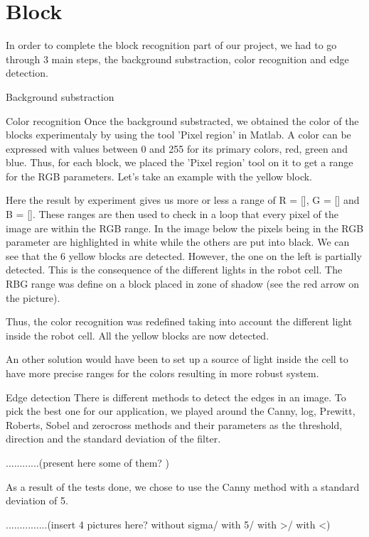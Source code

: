 
\chapter{Block}\label{ch:block_recognition}


In order to complete the block recognition part of our project, we had to go through 3 main steps, the background substraction, color recognition and edge detection.

Background substraction

Color recognition
 	Once the background substracted, we obtained the color of the blocks experimentaly by using the tool 'Pixel region' in Matlab. A color can be expressed with values between 0 and 255 for its primary colors, red, green and blue. Thus, for each block, we placed the 'Pixel region' tool on it to get a range for the RGB parameters.
Let's take an example with the yellow block.
 	\graphicspath{{figures/Thres_Y_manualy.png}}
Here the result by experiment gives us more or less a range of R = [], G = [] and B = []. These ranges are then used to check in a loop that every pixel of the image are within the RGB range.
In the image below the pixels being in the RGB parameter are highlighted in white while the others are put into black. We can see that the 6 yellow blocks are detected. 
However, the one on the left is partially detected. This is the consequence of the different lights in the robot cell. The RBG range was define on a block placed in zone of shadow (see the red arrow on the picture).
\graphicspath{{figures/Thres_Y_bad2.png}}
Thus, the color recognition was redefined taking into account the different light inside the robot cell. All the yellow blocks are now detected.
\graphicspath{{figures/Thres_Y_good.png}}
An other solution would have been to set up a source of light inside the cell to have more precise ranges for the colors resulting in more robust system.


Edge detection
 	There is different methods to detect the edges in an image. To pick the best one for our application, we played around the Canny, log, Prewitt, Roberts, Sobel and zerocross methods and their parameters as the threshold, direction and the standard deviation of the filter.

............(present here some of them? )

As a result of the tests done, we chose to use the Canny method with a standard deviation of 5.

...............(insert 4 pictures here? without sigma/ with 5/ with >/ with <)
